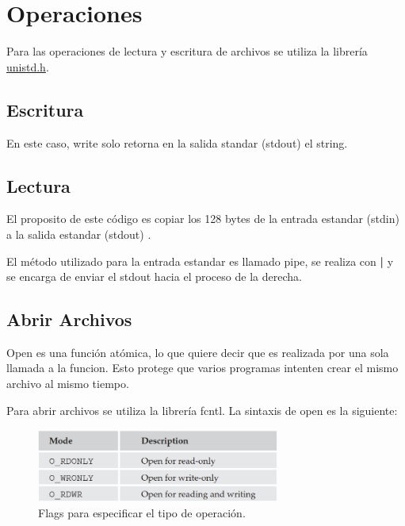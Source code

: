 \documentclass[journal]{IEEEtai}
\begin{document}
\section{Operaciones}

Para las operaciones de lectura y escritura de archivos se utiliza la librería \href{https://pubs.opengroup.org/onlinepubs/7908799/xsh/unistd.h.html}{unistd.h}.

\subsection{Escritura}






En este caso, write solo retorna en la salida standar (stdout) el string.



\subsection{Lectura}





El proposito de este código es copiar los 128 bytes de la entrada estandar (stdin) a la salida estandar (stdout) .



El método utilizado para la entrada estandar es llamado pipe, se realiza con \textbf{|} y se encarga de enviar el stdout hacia el proceso de la derecha.

\subsection{Abrir Archivos}
Open es una función atómica, lo que quiere decir que es realizada por una sola llamada a la funcion. Esto protege que varios programas intenten crear el mismo archivo al mismo tiempo.

Para abrir archivos se utiliza la librería fcntl. La sintaxis de open es la siguiente:



\begin{figure}[H]
\centering
\includegraphics[width=8cm]{img/oflags.png}
\caption{Flags para especificar el tipo de operación.}
\label{fig}
\end{figure}
\end{document}
